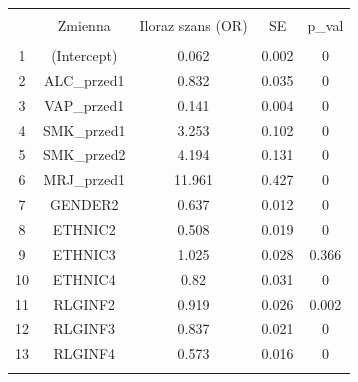 
\begin{tabular}{@{\extracolsep{5pt}} ccccc} 
\\[-1.8ex]\hline 
\hline \\[-1.8ex] 
 & Zmienna & Iloraz szans (OR) & SE & p\_val \\ 
\hline \\[-1.8ex] 
1 & (Intercept) & 0.062 & 0.002 & 0 \\ 
2 & ALC\_przed1 & 0.832 & 0.035 & 0 \\ 
3 & VAP\_przed1 & 0.141 & 0.004 & 0 \\ 
4 & SMK\_przed1 & 3.253 & 0.102 & 0 \\ 
5 & SMK\_przed2 & 4.194 & 0.131 & 0 \\ 
6 & MRJ\_przed1 & 11.961 & 0.427 & 0 \\ 
7 & GENDER2 & 0.637 & 0.012 & 0 \\ 
8 & ETHNIC2 & 0.508 & 0.019 & 0 \\ 
9 & ETHNIC3 & 1.025 & 0.028 & 0.366 \\ 
10 & ETHNIC4 & 0.82 & 0.031 & 0 \\ 
11 & RLGINF2 & 0.919 & 0.026 & 0.002 \\ 
12 & RLGINF3 & 0.837 & 0.021 & 0 \\ 
13 & RLGINF4 & 0.573 & 0.016 & 0 \\ 
\hline \\[-1.8ex] 
\end{tabular} 
